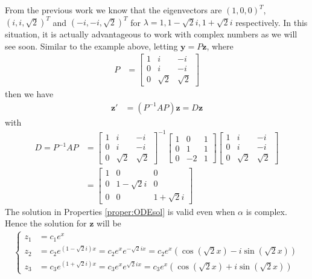 \begin{solution}
From the previous work we know that the eigenvectors are $(1,0,0)^T$, $(i, i,\sqrt{2})^T$ and $(-i,-i,\sqrt{2})^T$ for $\lambda = 1, 1-\sqrt{2}i, 1+\sqrt{2}i$ respectively. In this situation, it is actually advantageous to work with complex numbers as we will see soon. Similar to the example above, letting $\textbf{y} = P\textbf{z}$, where
\begin{align*}
P &=
\begin{bmatrix}
1 & i & -i \\
0 & i & -i \\
0 & \sqrt{2} & \sqrt{2} 
\end{bmatrix}
\end{align*}
then we have
\begin{align*}
\textbf{z}' &= (P^{-1}AP)\textbf{z} = D\textbf{z}
\end{align*}
with 
\begin{align*}
D = P^{-1}AP &= 
\begin{bmatrix}
1 & i & -i \\
0 & i & -i \\
0 & \sqrt{2} & \sqrt{2} 
\end{bmatrix}^{-1}
\begin{bmatrix}
1 & 0 & 1 \\
0 & 1 & 1 \\
0 & -2 & 1
\end{bmatrix}
\begin{bmatrix}
1 & i & -i \\
0 & i & -i \\
0 & \sqrt{2} & \sqrt{2} 
\end{bmatrix}
\\&=
\begin{bmatrix}
1 & 0 & 0 \\
0 & 1 - \sqrt{2}i & 0 \\
0 & 0 & 1 + \sqrt{2}i
\end{bmatrix}
\end{align*}
The solution in Properties \ref{proper:ODEsol} is valid even when $\alpha$ is complex. Hence the solution for $\textbf{z}$ will be
\begin{align*}
\left\{\begin{alignedat}{1}
z_1 &= c_1e^x \\
z_2 &= c_2e^{(1-\sqrt{2}i)x} = c_2e^{x}e^{-\sqrt{2}i x} = c_2e^{x}(\cos(\sqrt{2}x) - i\sin(\sqrt{2}x))\\
z_3 &= c_3e^{(1+\sqrt{2}i)x} = c_3e^{x}e^{\sqrt{2}i x} = c_3e^{x}(\cos(\sqrt{2}x) + i\sin(\sqrt{2}x))

\end{alignedat}
\end{align*}
\end{solution}
